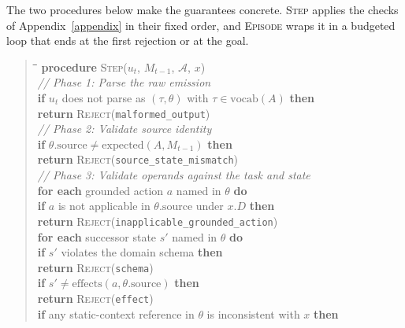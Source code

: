 The two procedures below make the guarantees concrete. \textsc{Step} applies the checks of Appendix~\ref{appendix} in their fixed order, and \textsc{Episode} wraps it in a budgeted loop that ends at the first rejection or at the goal.

\begin{quote}
\small
\begin{tabbing}
\hspace{1.5em}\=\hspace{1.5em}\=\hspace{1.5em}\=\kill
\textbf{procedure} \textsc{Step}($u_t$, $M_{t-1}$, $\mathcal{A}$, $x$) \\
\> \textit{// Phase 1: Parse the raw emission} \\
\> \textbf{if} $u_t$ does not parse as $(\tau, \theta)$ with $\tau \in \mathrm{vocab}(A)$ \textbf{then} \\
\>\> \textbf{return} \textsc{Reject}(\texttt{malformed\_output}) \\[2pt]
\> \textit{// Phase 2: Validate source identity} \\
\> \textbf{if} $\theta.\mathrm{source} \neq \mathrm{expected}(A, M_{t-1})$ \textbf{then} \\
\>\> \textbf{return} \textsc{Reject}(\texttt{source\_state\_mismatch}) \\[2pt]
\> \textit{// Phase 3: Validate operands against the task and state} \\
\> \textbf{for each} grounded action $a$ named in $\theta$ \textbf{do} \\
\>\> \textbf{if} $a$ is not applicable in $\theta.\mathrm{source}$ under $x.D$ \textbf{then} \\
\>\>\> \textbf{return} \textsc{Reject}(\texttt{inapplicable\_grounded\_action}) \\
\> \textbf{for each} successor state $s'$ named in $\theta$ \textbf{do} \\
\>\> \textbf{if} $s'$ violates the domain schema \textbf{then} \\
\>\>\> \textbf{return} \textsc{Reject}(\texttt{schema}) \\
\>\> \textbf{if} $s' \neq \mathrm{effects}(a, \theta.\mathrm{source})$ \textbf{then} \\
\>\>\> \textbf{return} \textsc{Reject}(\texttt{effect}) \\
\> \textbf{if} any static-context reference in $\theta$ is inconsistent with $x$ \textbf{then} \\

\end{tabbing}
\end{quote}
